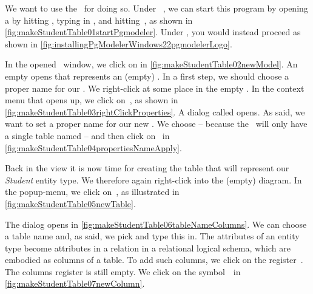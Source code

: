 We want to use the \pgmodeler\ for doing so.
Under \ubuntu\ \linux, we can start this program by opening a  by hitting \ubuntuTerminal, typing in , and hitting~\keys{\enter}, as shown in \cref{fig:makeStudentTable01startPgmodeler}.
Under \microsoftWindows, you would instead proceed as shown in \cref{fig:installingPgModelerWindows22pgmodelerLogo}.

In the opened \pgmodeler\ window, we click on  in \cref{fig:makeStudentTable02newModel}.
An empty  opens that represents an (empty) \db.
In a first step, we should choose a proper name for our \db.
We right-click at some place in the empty .
In the context menu that opens up, we click on~, as shown in \cref{fig:makeStudentTable03rightClickProperties}.
A dialog called  opens.
As said, we want to set a proper name for our new \db.
We choose  -- because the \db\ will only have a single table named  -- and then click on~ in \cref{fig:makeStudentTable04propertiesNameApply}.

Back in the  view it is now time for creating the table that will represent our \emph{Student} entity type.
We therefore again right-click into the (empty) diagram.
In the popup-menu, we click on~, as illustrated in \cref{fig:makeStudentTable05newTable}.

The  dialog opens in \cref{fig:makeStudentTable06tableNameColumns}.
We can choose a table name and, as said, we pick  and type this in.
The attributes of an entity type become attributes in a relation in a relational logical schema, which are embodied as columns of a table.
To add such columns, we click on the register~.
The columns register is still empty.
We click on the  symbol~\pgmodelerAddItem\ in \cref{fig:makeStudentTable07newColumn}.

